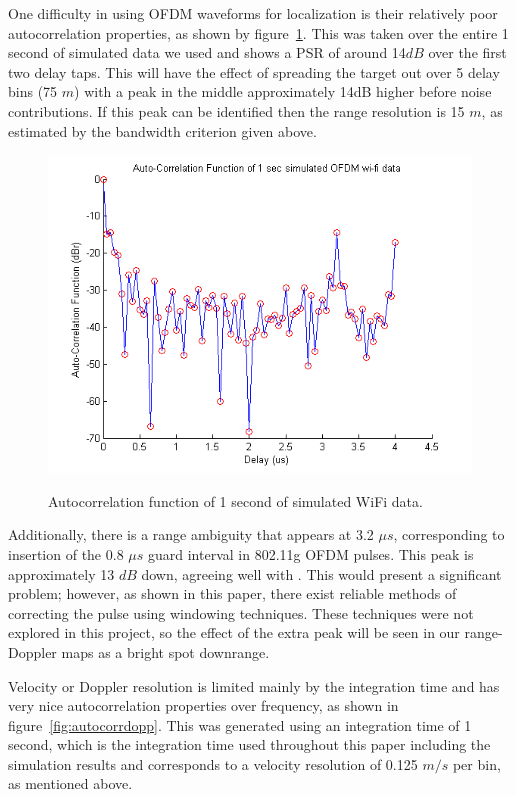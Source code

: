 \documentclass[article,11pt,onecolumn,final]{IEEEtran}
\begin{document}
One difficulty in using OFDM waveforms for localization is their relatively poor autocorrelation properties, as shown by figure~\ref{fig:autocorr}. This was taken over the entire 1 second of simulated data we used and shows a PSR of around 14$dB$ over the first two delay taps. This will have the effect of spreading the target out over 5 delay bins (75 $m$) with a peak in the middle approximately 14dB higher before noise contributions. If this peak can be identified then the range resolution is 15 $m$, as estimated by the bandwidth criterion given above. 

\begin{figure}
	\caption{Autocorrelation function of 1 second of simulated WiFi data.}
	\centering
	\includegraphics[width=400pt]{figures/autocorr.png}
	\label{fig:autocorr}
\end{figure}

Additionally, there is a range ambiguity that appears at 3.2 $\mu s$, corresponding to insertion of the 0.8 $\mu s$ guard interval in 802.11g OFDM pulses. This peak is approximately 13 $dB$ down, agreeing well with \cite{Colone2012}. This would present a significant problem; however, as shown in this paper, there exist reliable methods of correcting the pulse using windowing techniques. These techniques were not explored in this project, so the effect of the extra peak will be seen in our range-Doppler maps as a bright spot downrange.

Velocity or Doppler resolution is limited mainly by the integration time and has very nice autocorrelation properties over frequency, as shown in figure~\ref{fig:autocorrdopp}. This was generated using an integration time of 1 second, which is the integration time used throughout this paper including the simulation results and corresponds to a velocity resolution of 0.125 $m/s$ per bin, as mentioned above.
\end{document}
